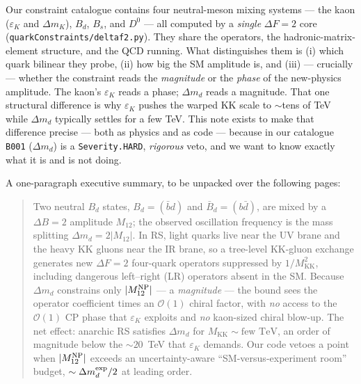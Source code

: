 \documentclass[11pt]{article}
\newcommand{\MKK}{M_{\mathrm{KK}}}
\newcommand{\Mtwelve}{M_{12}}
\newcommand{\Bd}{B_d}
\newcommand{\Bdbar}{\bar B_d}
\newcommand{\dmd}{\Delta m_d}
\newcommand{\epsK}{\varepsilon_K}
\newcommand{\code}[1]{\texttt{#1}}
\theoremstyle{definition}
\begin{document}
Our constraint catalogue contains four neutral-meson mixing systems --- the
kaon ($\epsK$ and $\Delta m_K$), $B_d$, $B_s$, and $D^0$ --- all computed by a
\emph{single} $\Delta F=2$ core (\code{quarkConstraints/deltaf2.py}). They share
the operators, the hadronic-matrix-element structure, and the QCD running. What
distinguishes them is (i) which quark bilinear they probe, (ii) how big the SM
amplitude is, and (iii) --- crucially --- whether the constraint reads the
\emph{magnitude} or the \emph{phase} of the new-physics amplitude. The kaon's
$\epsK$ reads a phase; $\dmd$ reads a magnitude. That one structural difference
is why $\epsK$ pushes the warped KK scale to $\sim$tens of TeV while $\dmd$
typically settles for a few TeV. This note exists to make that difference
precise --- both as physics and as code --- because in our catalogue
\code{B001} ($\dmd$) is a \code{Severity.HARD}, \emph{rigorous} veto, and we want
to know exactly what it is and is not doing.

A one-paragraph executive summary, to be unpacked over the following pages:

\begin{quote}
\small
Two neutral $B_d$ states, $\Bd=(\bar b d)$ and $\Bdbar=(b \bar d)$, are mixed by a
$\Delta B=2$ amplitude $\Mtwelve$; the observed oscillation frequency is the mass
splitting $\dmd = 2|\Mtwelve|$. In RS, light quarks live near the UV brane and the
heavy KK gluons near the IR brane, so a tree-level KK-gluon exchange generates new
$\Delta F=2$ four-quark operators suppressed by $1/\MKK^2$, including dangerous
left--right (LR) operators absent in the SM. Because $\dmd$ constrains only
$|\Mtwelve^{\rm NP}|$ --- a \emph{magnitude} --- the bound sees the operator
coefficient times an $\mathcal{O}(1)$ chiral factor, with \emph{no} access to the
$\mathcal{O}(1)$ CP phase that $\epsK$ exploits and \emph{no} kaon-sized chiral
blow-up. The net effect: anarchic RS satisfies $\dmd$ for
$\MKK\sim\text{few TeV}$, an order of magnitude below the $\sim20$~TeV that $\epsK$
demands. Our code vetoes a point when $|\Mtwelve^{\rm NP}|$ exceeds an
uncertainty-aware ``SM-versus-experiment room'' budget, $\sim\dmd^{\rm exp}/2$ at
leading order.
\end{quote}
\end{document}
